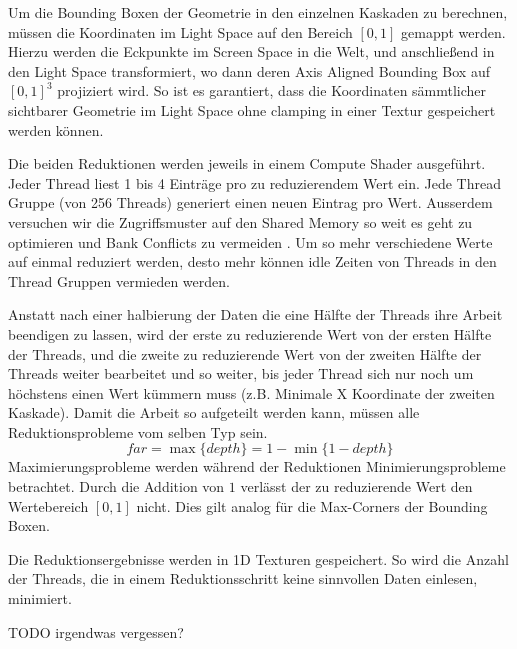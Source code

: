 \documentclass[runningheaders,a4paper]{llncs}
\begin{document}
Um die Bounding Boxen der Geometrie in den einzelnen Kaskaden zu berechnen, müssen die Koordinaten im Light Space auf den Bereich $[0, 1]$ gemappt werden.
Hierzu werden die Eckpunkte im Screen Space in die Welt, und anschließend in den Light Space transformiert, wo dann deren Axis Aligned Bounding Box auf $[0, 1]^3$ projiziert wird.
So ist es garantiert, dass die Koordinaten sämmtlicher sichtbarer Geometrie im Light Space ohne clamping in einer Textur gespeichert werden können.

Die beiden Reduktionen werden jeweils in einem Compute Shader ausgeführt.
Jeder Thread liest 1 bis 4 Einträge pro zu reduzierendem Wert ein.
Jede Thread Gruppe (von 256 Threads) generiert einen neuen Eintrag pro Wert.
Ausserdem versuchen wir die Zugriffsmuster auf den Shared Memory so weit es geht zu optimieren und Bank Conflicts zu vermeiden \cite{reduction}.
Um so mehr verschiedene Werte auf einmal reduziert werden, desto mehr können idle Zeiten von Threads in den Thread Gruppen vermieden werden.

Anstatt nach einer halbierung der Daten die eine Hälfte der Threads ihre Arbeit beendigen zu lassen, wird der erste zu reduzierende Wert von der ersten Hälfte der Threads, und die zweite zu reduzierende Wert von der zweiten Hälfte der Threads weiter bearbeitet und so weiter, bis jeder Thread sich nur noch um höchstens einen Wert kümmern muss (z.B. Minimale X Koordinate der zweiten Kaskade).
Damit die Arbeit so aufgeteilt werden kann, müssen alle Reduktionsprobleme vom selben Typ sein.
\begin{equation}
  far = \max\{ depth \} = 1 - \min \{ 1 - depth \}
\end{equation}
Maximierungsprobleme werden während der Reduktionen Minimierungsprobleme betrachtet.
Durch die Addition von $1$ verlässt der zu reduzierende Wert den Wertebereich $[0, 1]$ nicht.
Dies gilt analog für die Max-Corners der Bounding Boxen.

Die Reduktionsergebnisse werden in 1D Texturen gespeichert.
So wird die Anzahl der Threads, die in einem Reduktionsschritt keine sinnvollen Daten einlesen, minimiert.

TODO irgendwas vergessen?


\end{document}
